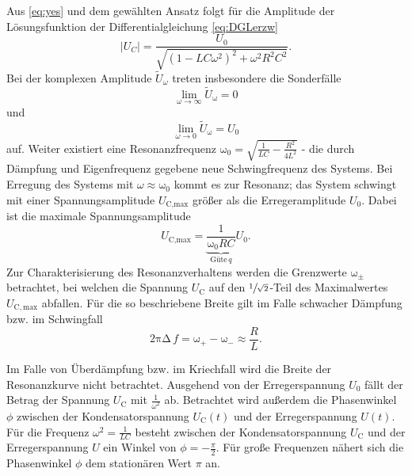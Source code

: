 Aus \eqref{eq:yes} und dem gewählten Ansatz folgt für die Amplitude der Lösungsfunktion der Differentialgleichung \eqref{eq:DGLerzw}
\begin{equation}
	|U_{C}| = \frac{U_0}{\sqrt{(1 − {LC}\omega^2)^2 +ω^2{R^2C^2}}}. 
\end{equation}
Bei der komplexen Amplitude $\tilde{U}_{\omega}$ treten insbesondere die Sonderfälle
\begin{equation}
 	\lim_{\omega\to\infty} \tilde{U}_\mathup{\omega} =0
\end{equation}
und
\begin{equation}
 \lim_{\omega\to 0}\tilde{U}_\mathup{\omega} = U_0
\end{equation} 
 auf.
Weiter existiert eine Resonanzfrequenz $\mathup{\omega_0} = \sqrt{\frac{1}{{LC}}-\frac{{R^2}}{4{L^2}}}$ - die durch Dämpfung und Eigenfrequenz gegebene neue Schwingfrequenz des Systems.
Bei Erregung des Systems mit $\omega \approx \mathup{\omega_0}$ kommt es zur Resonanz; das System schwingt mit einer Spannungsamplitude $U_\text{C,max}$ größer als die Erregeramplitude $U_0$.
Dabei ist die maximale Spannungsamplitude
\begin{equation}
	U_\text{C,max}= \underbrace{\frac{1}{\mathup{\omega_0}RC}}_{\text{Güte}\, q} U_0. 
	\label{eq:maxspannung}
\end{equation}
Zur Charakterisierung des Resonanzverhaltens werden die Grenzwerte $\mathup{\omega_\pm}$ betrachtet, bei welchen die Spannung $U_\mathup{C}$ auf den $\sfrac{1}{\sqrt{2}}$-Teil des Maximalwertes $U_\mathup{C,max}$ abfallen.  
Für die so beschriebene Breite gilt im Falle schwacher Dämpfung bzw. im Schwingfall
\begin{equation}
	\mathup{2\pi\Delta}\, f = \mathup{ω_+} − \mathup{ω_−} \approx \frac{{R}}{{L}}.
	\label{eq:deltaf}
\end{equation}

Im Falle von Überdämpfung bzw. im Kriechfall wird die Breite der Resonanzkurve nicht betrachtet. Ausgehend von der  Erregerspannung $U_0$ fällt der Betrag der Spannung $U_\mathup{C}$  mit $\frac{1}{\omega^2}$ ab.
Betrachtet wird außerdem die Phasenwinkel $\phi$ zwischen der Kondensatorspannung $U_\mathup{C}(t)$ und der Erregerspannung $U(t)$.\\
Für die Frequenz $\omega^2 = \frac{1}{{LC}}$ besteht zwischen der Kondensatorspannung $U_\text{C}$ und der Erregerspannung $U$ ein Winkel von $\phi =-\frac{\pi}{2}$.
Für große Frequenzen nähert sich die Phasenwinkel $\phi$ dem stationären Wert $\pi$ an.


